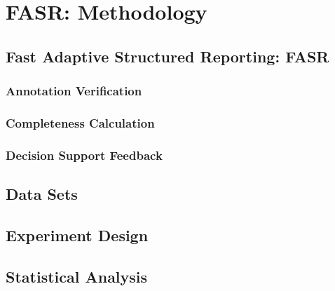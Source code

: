 \chapter{FASR: Methodology}

\section{Fast Adaptive Structured Reporting: FASR}

\subsection{Annotation Verification}

\subsection{Completeness Calculation}


\subsection{Decision Support Feedback}


\section{Data Sets}

\section{Experiment Design}

\section{Statistical Analysis}

